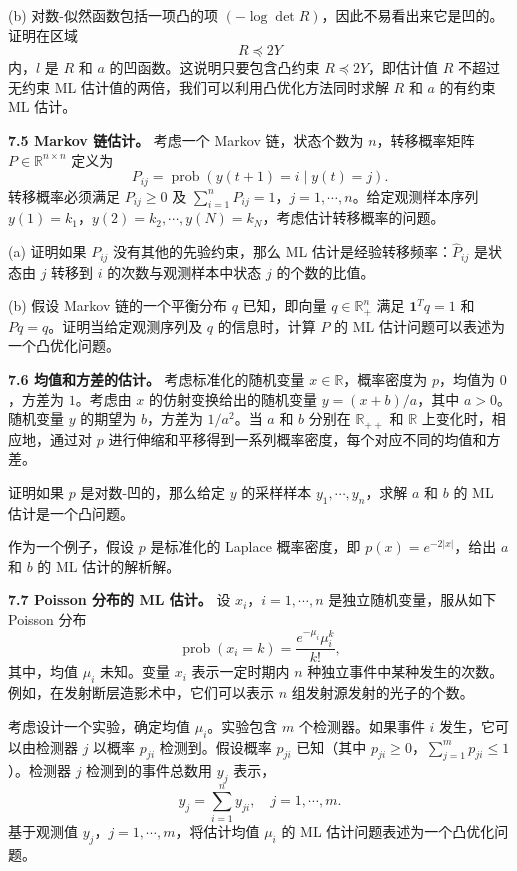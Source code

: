 \documentclass[UTF8,12pt,a4paper,fontset=fandol]{ctexart}
\begin{document}
(b) 对数-似然函数包括一项凸的项 $(-\log\det R)$，因此不易看出来它是凹的。证明在区域
\[
R\preceq 2Y
\]
内，$l$ 是 $R$ 和 $a$ 的凹函数。这说明只要包含凸约束 $R\preceq 2Y$，即估计值 $R$ 不超过无约束 ML 估计值的两倍，我们可以利用凸优化方法同时求解 $R$ 和 $a$ 的有约束 ML 估计。

\noindent\textbf{7.5 Markov 链估计。}\quad
考虑一个 Markov 链，状态个数为 $n$，转移概率矩阵 $P\in\mathbb{R}^{n\times n}$ 定义为
\[
P_{ij}=\operatorname{prob}(y(t+1)=i\mid y(t)=j).
\]
转移概率必须满足 $P_{ij}\geq 0$ 及 $\sum_{i=1}^nP_{ij}=1$，$j=1,\cdots,n$。给定观测样本序列 $y(1)=k_1$，$y(2)=k_2,\cdots,y(N)=k_N$，考虑估计转移概率的问题。

(a) 证明如果 $P_{ij}$ 没有其他的先验约束，那么 ML 估计是经验转移频率：$\hat{P}_{ij}$ 是状态由 $j$ 转移到 $i$ 的次数与观测样本中状态 $j$ 的个数的比值。

(b) 假设 Markov 链的一个平衡分布 $q$ 已知，即向量 $q\in\mathbb{R}_+^n$ 满足 $\mathbf{1}^Tq=1$ 和 $Pq=q$。证明当给定观测序列及 $q$ 的信息时，计算 $P$ 的 ML 估计问题可以表述为一个凸优化问题。

\noindent\textbf{7.6 均值和方差的估计。}\quad
考虑标准化的随机变量 $x\in\mathbb{R}$，概率密度为 $p$，均值为 $0$，方差为 $1$。考虑由 $x$ 的仿射变换给出的随机变量 $y=(x+b)/a$，其中 $a>0$。随机变量 $y$ 的期望为 $b$，方差为 $1/a^2$。当 $a$ 和 $b$ 分别在 $\mathbb{R}_{++}$ 和 $\mathbb{R}$ 上变化时，相应地，通过对 $p$ 进行伸缩和平移得到一系列概率密度，每个对应不同的均值和方差。

证明如果 $p$ 是对数-凹的，那么给定 $y$ 的采样样本 $y_1,\cdots,y_n$，求解 $a$ 和 $b$ 的 ML 估计是一个凸问题。

作为一个例子，假设 $p$ 是标准化的 Laplace 概率密度，即 $p(x)=e^{-2|x|}$，给出 $a$ 和 $b$ 的 ML 估计的解析解。

\noindent\textbf{7.7 Poisson 分布的 ML 估计。}\quad
设 $x_i$，$i=1,\cdots,n$ 是独立随机变量，服从如下 Poisson 分布
\[
\operatorname{prob}(x_i=k)=\frac{e^{-\mu_i}\mu_i^k}{k!},
\]
其中，均值 $\mu_i$ 未知。变量 $x_i$ 表示一定时期内 $n$ 种独立事件中某种发生的次数。例如，在发射断层造影术中，它们可以表示 $n$ 组发射源发射的光子的个数。

考虑设计一个实验，确定均值 $\mu_i$。实验包含 $m$ 个检测器。如果事件 $i$ 发生，它可以由检测器 $j$ 以概率 $p_{ji}$ 检测到。假设概率 $p_{ji}$ 已知（其中 $p_{ji}\geq 0$，$\sum_{j=1}^m p_{ji}\leq 1$）。检测器 $j$ 检测到的事件总数用 $y_j$ 表示，
\[
y_j=\sum_{i=1}^n y_{ji},\quad j=1,\cdots,m.
\]
基于观测值 $y_j$，$j=1,\cdots,m$，将估计均值 $\mu_i$ 的 ML 估计问题表述为一个凸优化问题。
\end{document}
